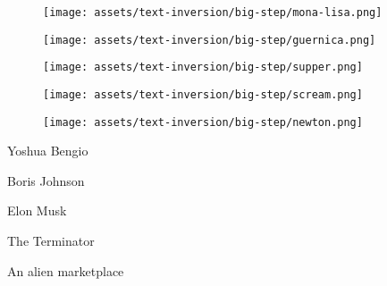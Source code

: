 \begin{figure*}[h]
\vspace{0.5ex}
\begin{minipage}[t]{.025\textwidth}
     \vspace{0pt}
\end{minipage}%
\hspace{1ex}
\begin{minipage}[t]{0.98\figwidth}
    \vspace{0pt}
    \begin{subfigure}[t]{0.2\textwidth}
        \texttt{[image: assets/text-inversion/big-step/mona-lisa.png]}
    \end{subfigure}%
    \begin{subfigure}[t]{0.2\textwidth}
        \texttt{[image: assets/text-inversion/big-step/guernica.png]}
    \end{subfigure}%
    \begin{subfigure}[t]{0.2\textwidth}
        \texttt{[image: assets/text-inversion/big-step/supper.png]}
    \end{subfigure}%
    \begin{subfigure}[t]{0.2\textwidth}
        \texttt{[image: assets/text-inversion/big-step/scream.png]}
    \end{subfigure}%
    \begin{subfigure}[t]{0.2\textwidth}
        \texttt{[image: assets/text-inversion/big-step/newton.png]}
    \end{subfigure}%
\end{minipage}

\vspace{1ex}
\begin{minipage}[t]{.025\textwidth}
     \vspace{0pt}
\end{minipage}%
\hspace{1ex}%
\begin{minipage}[t]{0.98\figwidth}
    \vspace{2mm}
    \begin{minipage}[t]{0.2\textwidth}
        \centering
        Yoshua Bengio
    \end{minipage}%
    \begin{minipage}[t]{0.2\textwidth}
        \centering
        Boris Johnson
    \end{minipage}%
    \begin{minipage}[t]{0.2\textwidth}
        \centering
        Elon Musk
    \end{minipage}%
    \begin{minipage}[t]{0.2\textwidth}
        \centering
        The Terminator
    \end{minipage}%
    \begin{minipage}[t]{0.2\textwidth}
        \centering
        An alien marketplace
    \end{minipage}%
\end{minipage}


\end{figure*}
